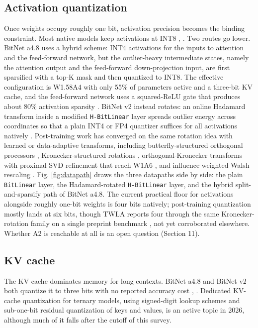 \documentclass[11pt]{article}
\begin{document}
\subsection{Activation quantization}

Once weights occupy roughly one bit, activation precision becomes the binding
constraint. Most native models keep activations at INT8 \cite{Ma2024-BitNetB158},
\cite{Ma2025-BitNet2B4T}. Two routes go lower. BitNet a4.8 uses a hybrid scheme: INT4
activations for the inputs to attention and the feed-forward network, but the
outlier-heavy intermediate states, namely the attention output and the feed-forward
down-projection input, are first sparsified with a top-K mask and then quantized to
INT8. The effective configuration is W1.58A4 with only 55\% of parameters active and a
three-bit KV cache, and the feed-forward network uses a squared-ReLU gate that produces
about 80\% activation sparsity \cite{Wang2024-BitNetA48}. BitNet v2 instead rotates: an
online Hadamard transform inside a modified \texttt{H-BitLinear} layer spreads outlier energy
across coordinates so that a plain INT4 or FP4 quantizer suffices for all activations
natively \cite{Wang2025-BitNetV2}. Post-training work has converged on the same rotation
idea with learned or data-adaptive transforms, including butterfly-structured orthogonal
processors \cite{Zagitov2026-HARP}, Kronecker-structured rotations \cite{Zhao2026-TWLA},
orthogonal-Kronecker transforms with proximal-SVD refinement that reach W1A6
\cite{Zhao2026-BWLA}, and influence-weighted Walsh rescaling \cite{Pavlov2026-InfluenceRotations}.
Fig. \ref{fig:datapath} draws the three datapaths side by side: the plain \texttt{BitLinear} layer, the
Hadamard-rotated \texttt{H-BitLinear} layer, and the hybrid split-and-sparsify path of BitNet
a4.8. The current practical floor for activations alongside roughly one-bit weights is
four bits natively; post-training quantization mostly lands at six bits, though TWLA
reports four through the same Kronecker-rotation family on a single preprint benchmark
\cite{Zhao2026-TWLA}, not yet corroborated elsewhere. Whether A2 is reachable at all is an
open question (Section 11).

\subsection{KV cache}

The KV cache dominates memory for long contexts. BitNet a4.8 and BitNet v2 both quantize
it to three bits with no reported accuracy cost \cite{Wang2024-BitNetA48},
\cite{Wang2025-BitNetV2}. Dedicated KV-cache quantization for ternary models, using
signed-digit lookup schemes and sub-one-bit residual quantization of keys and values,
is an active topic in 2026, although much of it falls after the cutoff of this survey.
\end{document}
